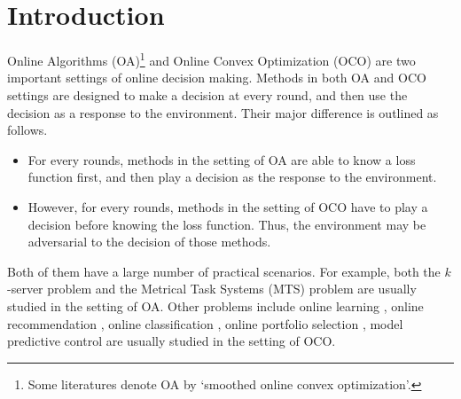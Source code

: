 \documentclass[journal]{IEEEtran}
\begin{document}
%
\IEEEpeerreviewmaketitle




\section{Introduction}
\label{sect_introduction}

Online Algorithms (OA)\footnote{Some literatures denote OA by `smoothed online convex optimization'.} \cite{pmlr-v75-chen18b,Chen:2016:UPO,renault-101007} and Online Convex Optimization (OCO) \cite{introduction-online-optimization,Hazan2016Introduction,ShalevShwartz:2012dz} are two important settings of online decision making. Methods in both OA and OCO settings are designed to  make a decision at every round, and then use the decision as a response to the environment. Their major difference is outlined as follows.
\begin{itemize}
\item For every rounds, methods in the setting of OA are able to know a loss function first, and then play a decision as the response to the environment.
\item However, for every rounds, methods in the setting of OCO have to play a decision before knowing the loss function. Thus, the environment may be adversarial to the decision of those methods.
\end{itemize}
Both of them have a large number of practical scenarios. For example, both the $k$-server problem \cite{Lee:2018wt,Bansal:2010:MTS} and the Metrical Task Systems (MTS) problem \cite{Abernethy:2010,Bubeck:2019vp,Bansal:2010:MTS}  are usually studied in the setting of OA. Other problems include online learning \cite{7401075,Yang:2013:EOL,8610120,8260919},  online recommendation \cite{Wang:2016:IAR}, online classification \cite{NIPS2003_2385,NIPS2010_3896}, online portfolio selection \cite{Li:2013:CWM}, model predictive control \cite{MORARI1999667} are usually studied in the setting of OCO. 

\end{document}
